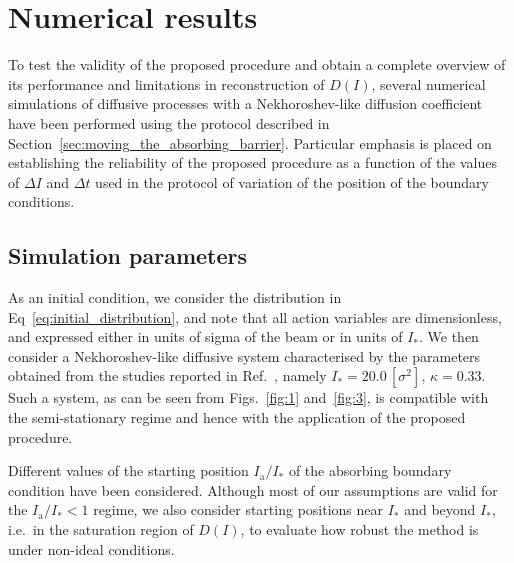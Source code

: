 
\section{Numerical results}
\label{sec:numerical_results}


To test the validity of the proposed procedure and obtain a complete overview of its performance and limitations in reconstruction of $D(I)$, several numerical simulations of diffusive processes with a Nekhoroshev-like diffusion coefficient have been performed using the protocol described in Section~\ref{sec:moving_the_absorbing_barrier}. Particular emphasis is placed on establishing the reliability of the proposed procedure as a function of the values of $\Delta I$ and $\Delta t$ used in the protocol of variation of the position of the boundary conditions.


\subsection{Simulation parameters}


As an initial condition, we consider the distribution in Eq~\eqref{eq:initial_distribution}, and note that all action variables are {dimensionless, and expressed either in units of sigma of the beam or in units of $I_\ast$}. We then consider a Nekhoroshev-like diffusive system characterised by the parameters obtained from the studies reported in Ref.~\cite{bazzani2020diffusion}, namely $I_\ast = 20.0\,[\sigma^2]$, $\kappa = 0.33$. Such a system, as can be seen from Figs.~\ref{fig:1} and~\ref{fig:3}, is compatible with the semi-stationary regime and hence with the application of the proposed procedure.

Different values of the starting position $I_\mathrm{a}/I_\ast$ of the absorbing boundary condition have been considered. Although most of our assumptions are valid for the $I_\mathrm{a}/I_\ast < 1$ regime, we also consider starting positions near $I_\ast$ and beyond $I_\ast$, i.e.\ in the saturation region of $D(I)$, to evaluate how robust the method is under non-ideal conditions.

